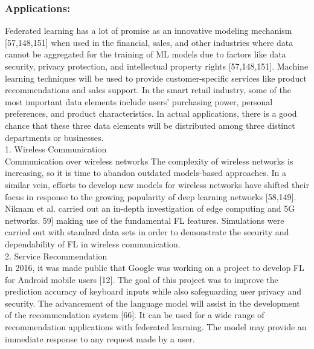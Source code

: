 \documentclass[openacc]{rsproca_new}%
\begin{document}
\subsubsection{Applications:}
Federated learning has a lot of promise as an innovative modeling mechanism [57,148,151] when used in the financial, sales, and other industries where data cannot be aggregated for the training of ML models due to factors like data security, privacy protection, and intellectual property rights [57,148,151]. Machine learning techniques will be used to provide customer-specific services like product recommendations and sales support. In the smart retail industry, some of the most important data elements include users' purchasing power, personal preferences, and product characteristics. In actual applications, there is a good chance that these three data elements will be distributed among three distinct departments or businesses.
\\
1. Wireless Communication
\\
Communication over wireless networks The complexity of wireless networks is increasing, so it is time to abandon outdated models-based approaches. In a similar vein, efforts to develop new models for wireless networks have shifted their focus in response to the growing popularity of deep learning networks [58,149]. Niknam et al. carried out an in-depth investigation of edge computing and 5G networks. 59] making use of the fundamental FL features. Simulations were carried out with standard data sets in order to demonstrate the security and dependability of FL in wireless communication.
\\
2. Service Recommendation 
\\
In 2016, it was made public that Google was working on a project to develop FL for Android mobile users [12]. The goal of this project was to improve the prediction accuracy of keyboard inputs while also safeguarding user privacy and security. The advancement of the language model will assist in the development of the recommendation system [66]. It can be used for a wide range of recommendation applications with federated learning. The model may provide an immediate response to any request made by a user.
\\
\end{document}
